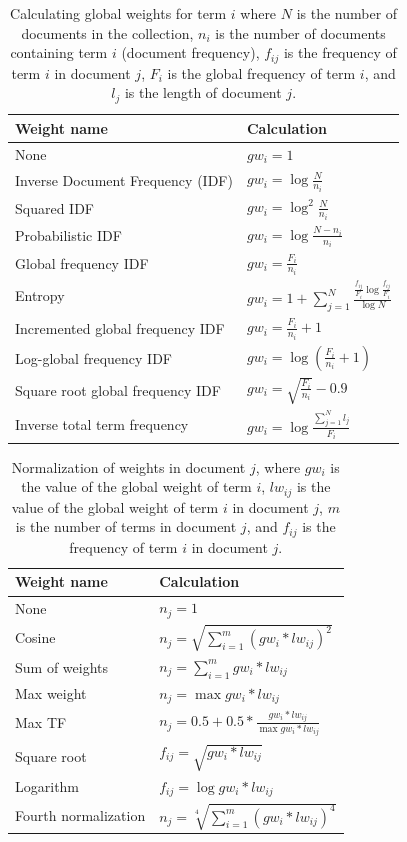 \begin{table}[!ht]
\centering
\caption{Calculating global weights for term $i$ where $N$ is the number of documents in the collection, $n_i$ is the number of documents containing term $i$ (document frequency), $f_{ij}$ is the frequency of term $i$ in document $j$, $F_i$ is the global frequency of term $i$, and $l_j$ is the length of document $j$.}
\begin{tabular}{l|l}
\hline
\textbf{Weight name} & \textbf{Calculation} \\ \hline
None & $gw_i = 1$ \\ \hline
Inverse Document Frequency (IDF) & $gw_i = \log \frac{N}{n_i}$ \\ \hline
Squared IDF & $gw_i = \log^2 \frac{N}{n_i}$ \\ \hline
Probabilistic IDF & $gw_i = \log \frac{N - n_i}{n_i}$ \\ \hline
Global frequency IDF & $gw_i = \frac{F_i}{n_i}$ \\ \hline
Entropy & $gw_i = 1 + \sum_{j=1}^{N}\frac{\frac{f_{ij}}{F_i} \log \frac{f_{ij}}{F_i}}{\log N}$ \\ \hline
Incremented global frequency IDF & $gw_i = \frac{F_i}{n_i} + 1$ \\ \hline
Log-global frequency IDF & $gw_i = \log \left( \frac{F_i}{n_i} + 1 \right)$ \\ \hline
Square root global frequency IDF & $gw_i = \sqrt{\frac{F_i}{n_i}} - 0.9$ \\ \hline
Inverse total term frequency & $gw_i = \log \frac{\sum_{j=1}^{N} l_j}{F_i}$ \\ \hline
\end{tabular}
\end{table}

\begin{table}[!ht]
\centering
\caption{Normalization of weights in document $j$, where $gw_i$ is the value of the global weight of term $i$, $lw_{ij}$ is the value of the global weight of term $i$ in document $j$, $m$ is the number of terms in document $j$, and $f_{ij}$ is the frequency of term $i$ in document $j$.}

\begin{tabular}{l|l}
\hline
\textbf{Weight name} & \textbf{Calculation} \\ \hline
None & $n_j = 1$ \\ \hline
Cosine & $n_j = \sqrt{\sum_{i=1}^{m} (gw_i * lw_{ij})^2}$ \\ \hline
Sum of weights & $n_j = \sum_{i=1}^{m} gw_i * lw_{ij}$ \\ \hline
Max weight & $n_j = \max gw_i * lw_{ij}$ \\ \hline
Max TF & $n_j = 0.5 + 0.5 * \frac{gw_i * lw_{ij}}{\max gw_i * lw_{ij}}$ \\ \hline
Square root & $f_{ij} = \sqrt{gw_i * lw_{ij}}$ \\ \hline
Logarithm & $f_{ij} = \log gw_i * lw_{ij}$ \\ \hline
Fourth normalization & $n_j = \sqrt[4]{\sum_{i=1}^{m} (gw_i * lw_{ij})^4}$ \\ \hline
\end{tabular}
\end{table}


